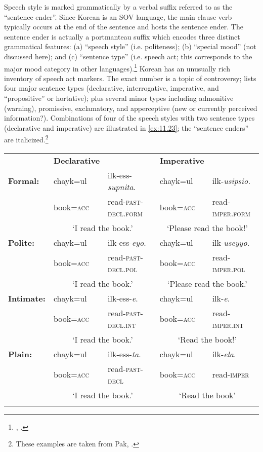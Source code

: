 Speech style is marked grammatically by a verbal suffix referred to as the “sentence ender”. Since Korean is an SOV language, the main clause verb typically occurs at the end of the sentence and hosts the sentence ender. The sentence ender is actually a portmanteau suffix which encodes three distinct grammatical features: (a) “speech style” (i.e. politeness); (b) “special mood” (not discussed here); and (c) “sentence type” (i.e. speech act; this corresponds to the major mood category in other languages).\footnote{\citet{Sohn1999}, \citet{Pak2008}.} Korean has an unusually rich inventory of speech act markers. The exact number is a topic of controversy; \citet{Sohn1999} lists four major sentence types (declarative, interrogative, imperative, and “propositive” or hortative); plus several minor types including admonitive (warning), promissive, exclamatory, and apperceptive (new or currently perceived information?). Combinations of four of the speech styles with two sentence types (declarative and imperative) are illustrated in \ref{ex:11.23}; the “sentence enders” are italicized.\footnote{These examples are taken from Pak, \citet{PortnerZanuttini2013}.}

\ea \label{ex:11.23}
\begin{tabularx}{\textwidth}{XXXXX}
\lsptoprule
\hhline{~----} & \bfseries Declarative &  & \bfseries Imperative & \\
\hhline{~----}
\bfseries Formal: & chayk=ul & ilk-ess-\textit{supnita}. & chayk=ul & ilk-\textit{usipsio.}\\
& book=\textsc{acc} & read-\textsc{past-decl.form} & book=\textsc{acc} & read-\textsc{imper.form}\\
& \multicolumn{2}{c}{‘I read the book.’} & \multicolumn{2}{c}{‘Please read the book!’}\\
\hhline{~----}
\bfseries Polite: & chayk=ul & ilk-ess-\textit{eyo}. & chayk=ul & ilk-\textit{useyyo.}\\
& book=\textsc{acc} & read-\textsc{past-decl.pol} & book=\textsc{acc} & read-\textsc{imper.pol}\\
& \multicolumn{2}{c}{‘I read the book.’} & \multicolumn{2}{c}{‘Please read the book.’}\\
\hhline{~----}
\bfseries Intimate: & chayk=ul & ilk-ess-\textit{e}. & chayk=ul & ilk-\textit{e}.\\
& book=\textsc{acc} & read-\textsc{past-decl.int} & book=\textsc{acc} & read-\textsc{imper.int}\\
& \multicolumn{2}{c}{‘I read the book.’} & \multicolumn{2}{c}{‘Read the book!’}\\
\hhline{~----}
\bfseries Plain: & chayk=ul & ilk-ess-\textit{ta}. & chayk=ul & ilk-\textit{ela}.\\
& book=\textsc{acc} & read-\textsc{past-decl} & book=\textsc{acc} & read-\textsc{imper}\\
& \multicolumn{2}{c}{‘I read the book.’} & \multicolumn{2}{c}{‘Read the book’}\\
\hhline{~----}
\lspbottomrule
\end{tabularx}
\z

